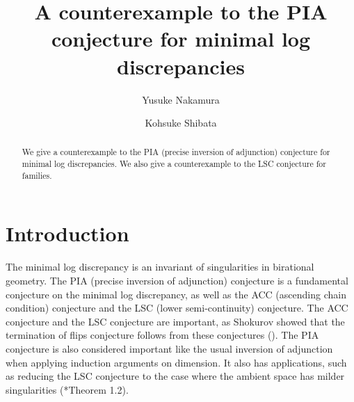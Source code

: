 \documentclass[a4paper,11pt]{amsart}
\title[A counterexample to the PIA conjecture]
{A counterexample to the PIA conjecture for minimal log discrepancies}
\author{Yusuke Nakamura}
\author{Kohsuke Shibata}
\theoremstyle{definition}
\theoremstyle{remark}
\begin{document}
\begin{abstract}
We give a counterexample to the PIA (precise inversion of adjunction) conjecture for minimal log discrepancies. 
We also give a counterexample to the LSC conjecture for families. 
\end{abstract}

\maketitle

\section{Introduction}
The minimal log discrepancy is an invariant of singularities in birational geometry. 
The PIA (precise inversion of adjunction) conjecture is a fundamental conjecture on the minimal log discrepancy, 
as well as the ACC (ascending chain condition) conjecture and the LSC (lower semi-continuity) conjecture. 
The ACC conjecture and the LSC conjecture are important, 
as Shokurov showed that the termination of flips conjecture follows from these conjectures (\cite{Sho04}). 
The PIA conjecture is also considered important like the usual inversion of adjunction when applying induction arguments on dimension.
It also has applications, such as reducing the LSC conjecture to the case where the ambient space has milder singularities (\cite{EM04}*{Theorem 1.2}). 
\end{document}

